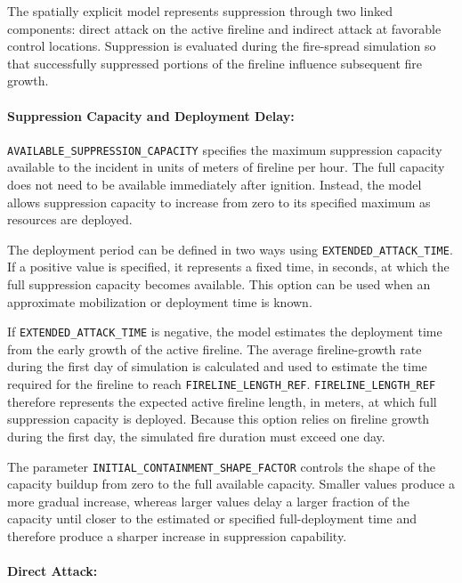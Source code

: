 The spatially explicit model represents suppression through two linked
components: direct attack on the active fireline and indirect attack at favorable
control locations. Suppression is evaluated during the fire-spread simulation so
that successfully suppressed portions of the fireline influence subsequent fire
growth.

\paragraph{Suppression Capacity and Deployment Delay:}

\verb|AVAILABLE_SUPPRESSION_CAPACITY| specifies the maximum suppression
capacity available to the incident in units of meters of fireline per hour.
The full capacity does not need to be available immediately after ignition.
Instead, the model allows suppression capacity to increase from zero to its
specified maximum as resources are deployed.

The deployment period can be defined in two ways using
\verb|EXTENDED_ATTACK_TIME|. If a positive value is specified, it represents a
fixed time, in seconds, at which the full suppression capacity becomes available.
This option can be used when an approximate mobilization or deployment time is
known.

If \verb|EXTENDED_ATTACK_TIME| is negative, the model estimates the deployment
time from the early growth of the active fireline. The average fireline-growth
rate during the first day of simulation is calculated and used to estimate the
time required for the fireline to reach \verb|FIRELINE_LENGTH_REF|.
\verb|FIRELINE_LENGTH_REF| therefore represents the expected active fireline
length, in meters, at which full suppression capacity is deployed. Because this
option relies on fireline growth during the first day, the simulated fire duration
must exceed one day.

The parameter \verb|INITIAL_CONTAINMENT_SHAPE_FACTOR| controls the shape of the
capacity buildup from zero to the full available capacity. Smaller values produce
a more gradual increase, whereas larger values delay a larger fraction of the
capacity until closer to the estimated or specified full-deployment time and
therefore produce a sharper increase in suppression capability.

\paragraph{Direct Attack:}


